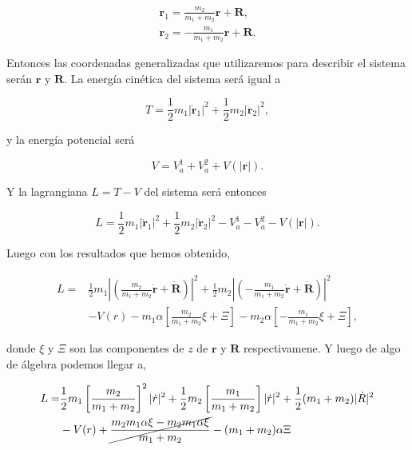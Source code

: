 \documentclass[a4paper,10pt]{article}
\numberwithin{equation}{section}
\begin{document}
\begin{align}
 \mathbf{r}_1 = \frac{m_2}{m_1 + m_2}\mathbf{r} + \mathbf{R}, \\
 \mathbf{r}_2 = - \frac{m_1}{m_1 + m_2}\mathbf{r} + \mathbf{R}.
\end{align}

Entonces las coordenadas generalizadas que utilizaremos para describir el sistema serán
$\mathbf{r}$ y $\mathbf{R}$. La energía cinética del sistema será igual a 

\begin{equation}
 T = \frac{1}{2}m_1|\dot{\mathbf{r}}_1|^2 + \frac{1}{2}m_2|\dot{\mathbf{r}}_2|^2,
\end{equation}

y la energía potencial será

\begin{equation}
 V = V_{a}^{1} + V_{a}^{2} + V(|\mathbf{r}|).
\end{equation}

Y la lagrangiana $L = T- V$ del sistema será entonces

\begin{equation}
 L = \frac{1}{2}m_1|\dot{\mathbf{r}}_1|^2 + \frac{1}{2}m_2|\dot{\mathbf{r}}_2|^2 - V_{a}^{1} - V_{a}^{2} - V(|\mathbf{r}|).
\end{equation}

Luego con los resultados que hemos obtenido,

\begin{align}
 L = &\frac{1}{2}m_1 \left|\left(\frac{m_2}{m_1 + m_2}\dot{\mathbf{r}}+  \dot{\mathbf{R}}  \right)\right|^2
 + \frac{1}{2}m_2 \left|\left(- \frac{m_1}{m_1 + m_2}\dot{\mathbf{r}}+  \dot{\mathbf{R}}  \right)\right|^2 \\
 &- V(r) - m_1\alpha\left[\frac{m_2}{m_1 + m_2}\xi+\Xi \right] - m_2\alpha \left[- \frac{m_1}{m_1 + m_2}\xi+\Xi \right],
\end{align}

donde $\xi$ y $\Xi$ son las componentes de $z$ de $\mathbf{r}$ y $\mathbf{R}$ respectivamene. Y luego 
de algo de álgebra podemos llegar a,

\begin{align}
 L = &\frac{1}{2}m_1\left[\frac{m_2}{m_1 + m_2} \right]^2 |\dot{r}|^2 + \frac{1}{2}m_2\left[\frac{m_1}{m_1 + m_2} \right]|\dot{r}|^2 
 + \frac{1}{2}(m_1 + m_2)|\dot{R}|^2 \\
 &- V(r) + \cancel{\frac{m_2 m_1 \alpha \xi - m_2 m_1 \alpha \xi }{m_1 + m_2}} - (m_1 + m_2)\alpha \Xi
\end{align}
\end{document}
